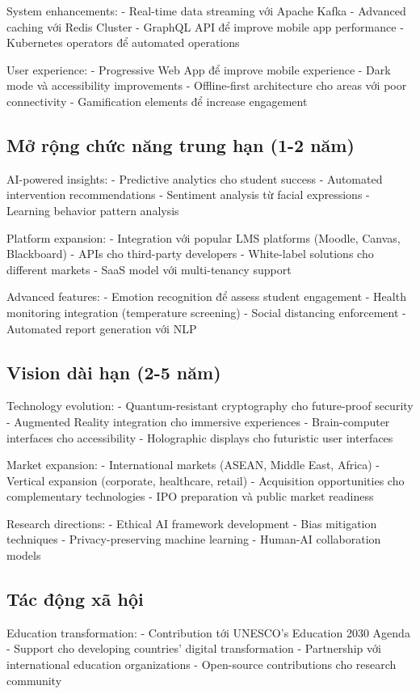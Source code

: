 \documentclass[12pt,a4paper]{report}
\begin{document}
System enhancements:
- Real-time data streaming với Apache Kafka
- Advanced caching với Redis Cluster
- GraphQL API để improve mobile app performance
- Kubernetes operators để automated operations

User experience:
- Progressive Web App để improve mobile experience
- Dark mode và accessibility improvements
- Offline-first architecture cho areas với poor connectivity
- Gamification elements để increase engagement

\subsection{Mở rộng chức năng trung hạn (1-2 năm)}
AI-powered insights:
- Predictive analytics cho student success
- Automated intervention recommendations
- Sentiment analysis từ facial expressions
- Learning behavior pattern analysis

Platform expansion:
- Integration với popular LMS platforms (Moodle, Canvas, Blackboard)
- APIs cho third-party developers
- White-label solutions cho different markets
- SaaS model với multi-tenancy support

Advanced features:
- Emotion recognition để assess student engagement
- Health monitoring integration (temperature screening)
- Social distancing enforcement
- Automated report generation với NLP

\subsection{Vision dài hạn (2-5 năm)}
Technology evolution:
- Quantum-resistant cryptography cho future-proof security
- Augmented Reality integration cho immersive experiences
- Brain-computer interfaces cho accessibility
- Holographic displays cho futuristic user interfaces

Market expansion:
- International markets (ASEAN, Middle East, Africa)
- Vertical expansion (corporate, healthcare, retail)
- Acquisition opportunities cho complementary technologies
- IPO preparation và public market readiness

Research directions:
- Ethical AI framework development
- Bias mitigation techniques
- Privacy-preserving machine learning
- Human-AI collaboration models

\subsection{Tác động xã hội}
Education transformation:
- Contribution tới UNESCO's Education 2030 Agenda
- Support cho developing countries' digital transformation
- Partnership với international education organizations
- Open-source contributions cho research community
\end{document}
